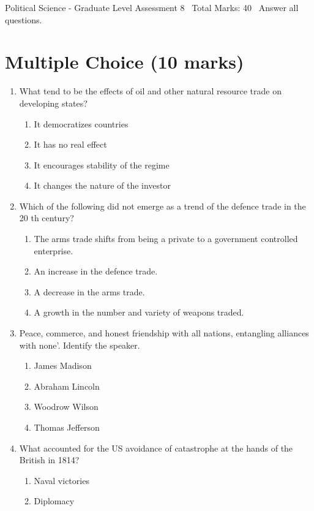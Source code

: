 \documentclass[12pt]{article}
\begin{document}
\begin{center}
Political Science - Graduate Level Assessment 8 \
Total Marks: 40 \
Answer all questions.
\end{center}

\section*{Multiple Choice (10 marks)}
\begin{enumerate}[label=\arabic*.]
\item What tend to be the effects of oil and other natural resource trade on developing states?
\begin{enumerate}[label=(\alph*)]
    \item It democratizes countries
    \item It has no real effect
    \item It encourages stability of the regime
    \item It changes the nature of the investor
\end{enumerate}
\item Which of the following did not emerge as a trend of the defence trade in the 20 th century?
\begin{enumerate}[label=(\alph*)]
    \item The arms trade shifts from being a private to a government controlled enterprise.
    \item An increase in the defence trade.
    \item A decrease in the arms trade.
    \item A growth in the number and variety of weapons traded.
\end{enumerate}
\item Peace, commerce, and honest friendship with all nations, entangling alliances with none'. Identify the speaker.
\begin{enumerate}[label=(\alph*)]
    \item James Madison
    \item Abraham Lincoln
    \item Woodrow Wilson
    \item Thomas Jefferson
\end{enumerate}
\item What accounted for the US avoidance of catastrophe at the hands of the British in 1814?
\begin{enumerate}[label=(\alph*)]
    \item Naval victories
    \item Diplomacy

\end{enumerate}
\end{enumerate}
\end{document}
